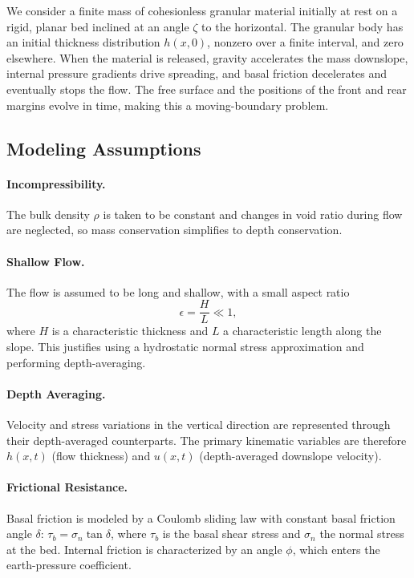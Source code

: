 \documentclass[10pt, conference]{FMFP2023}
\begin{document}
We consider a finite mass of cohesionless granular material initially
at rest on a rigid, planar bed inclined at an angle $\zeta$ to the
horizontal.
The granular body has an initial thickness distribution $h(x,0)$,
nonzero over a finite interval, and zero elsewhere.
When the material is released, gravity accelerates the mass downslope,
internal pressure gradients drive spreading, and basal friction
decelerates and eventually stops the flow.
The free surface and the positions of the front and rear margins evolve
in time, making this a moving-boundary problem.

\subsection{Modeling Assumptions}

\paragraph{Incompressibility.}
The bulk density $\rho$ is taken to be constant and changes in void
ratio during flow are neglected, so mass conservation simplifies to
depth conservation.

\paragraph{Shallow Flow.}
The flow is assumed to be long and shallow, with a small aspect ratio
\[
  \epsilon = \frac{H}{L} \ll 1,
\]
where $H$ is a characteristic thickness and $L$ a characteristic
length along the slope.
This justifies using a hydrostatic normal stress approximation and
performing depth-averaging.

\paragraph{Depth Averaging.}
Velocity and stress variations in the vertical direction are
represented through their depth-averaged counterparts.
The primary kinematic variables are therefore $h(x,t)$ (flow thickness)
and $u(x,t)$ (depth-averaged downslope velocity).

\paragraph{Frictional Resistance.}
Basal friction is modeled by a Coulomb sliding law with constant basal
friction angle $\delta$: $\tau_b = \sigma_n\tan\delta$, where $\tau_b$
is the basal shear stress and $\sigma_n$ the normal stress at the bed.
Internal friction is characterized by an angle $\phi$, which enters
the earth-pressure coefficient.
\end{document}
